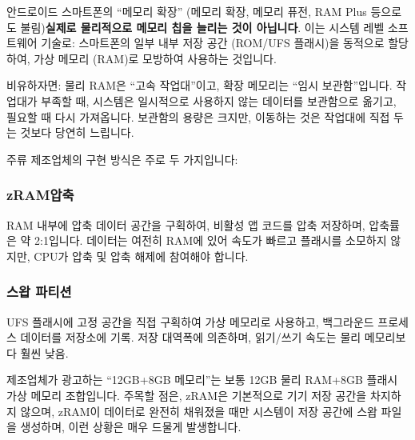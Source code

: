 


안드로이드 스마트폰의 “메모리 확장” (메모리 확장, 메모리 퓨전, RAM Plus 등으로도 불림)\textbf{실제로 물리적으로 메모리 칩을 늘리는 것이 아닙니다}. 이는 시스템 레벨 소프트웨어 기술로: 스마트폰의 일부 내부 저장 공간 (ROM/UFS 플래시)을 동적으로 할당하여, 가상 메모리 (RAM)로 모방하여 사용하는 것입니다.

비유하자면: 물리 RAM은 “고속 작업대”이고, 확장 메모리는 “임시 보관함”입니다. 작업대가 부족할 때, 시스템은 일시적으로 사용하지 않는 데이터를 보관함으로 옮기고, 필요할 때 다시 가져옵니다. 보관함의 용량은 크지만, 이동하는 것은 작업대에 직접 두는 것보다 당연히 느립니다.


주류 제조업체의 구현 방식은 주로 두 가지입니다:

\subsubsection*{zRAM압축}

RAM 내부에 압축 데이터 공간을 구획하여, 비활성 앱 코드를 압축 저장하며, 압축률은 약 2:1입니다. 데이터는 여전히 RAM에 있어 속도가 빠르고 플래시를 소모하지 않지만, CPU가 압축 및 압축 해제에 참여해야 합니다.

\subsubsection*{스왑 파티션}

UFS 플래시에 고정 공간을 직접 구획하여 가상 메모리로 사용하고, 백그라운드 프로세스 데이터를 저장소에 기록. 저장 대역폭에 의존하며, 읽기/쓰기 속도는 물리 메모리보다 훨씬 낮음.

제조업체가 광고하는 “12GB+8GB 메모리”는 보통 12GB 물리 RAM+8GB 플래시 가상 메모리 조합입니다. 주목할 점은, zRAM은 기본적으로 기기 저장 공간을 차지하지 않으며, zRAM이 데이터로 완전히 채워졌을 때만 시스템이 저장 공간에 스왑 파일을 생성하며, 이런 상황은 매우 드물게 발생합니다.


